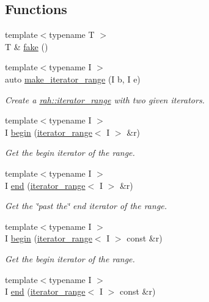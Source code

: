 \subsection*{Functions}
\begin{DoxyCompactItemize}
\item 
{\footnotesize template$<$typename T $>$ }\\T \& \mbox{\hyperlink{namespacerah_a11785bbdf970efa1bc57fc14993b77bf}{fake}} ()
\item 
{\footnotesize template$<$typename I $>$ }\\auto \mbox{\hyperlink{namespacerah_a4e145bfeb8a932058e20fc4cb4e7c206}{make\+\_\+iterator\+\_\+range}} (I b, I e)
\begin{DoxyCompactList}\small\item\em Create a \mbox{\hyperlink{structrah_1_1iterator__range}{rah\+::iterator\+\_\+range}} with two given iterators. \end{DoxyCompactList}\item 
{\footnotesize template$<$typename I $>$ }\\I \mbox{\hyperlink{namespacerah_a2c4a19e57cc4e0753e93830f247def6d}{begin}} (\mbox{\hyperlink{structrah_1_1iterator__range}{iterator\+\_\+range}}$<$ I $>$ \&r)
\begin{DoxyCompactList}\small\item\em Get the begin iterator of the range. \end{DoxyCompactList}\item 
{\footnotesize template$<$typename I $>$ }\\I \mbox{\hyperlink{namespacerah_aaddd1442cd76b96876e692cdefe7261d}{end}} (\mbox{\hyperlink{structrah_1_1iterator__range}{iterator\+\_\+range}}$<$ I $>$ \&r)
\begin{DoxyCompactList}\small\item\em Get the \char`\"{}past the\char`\"{} end iterator of the range. \end{DoxyCompactList}\item 
{\footnotesize template$<$typename I $>$ }\\I \mbox{\hyperlink{namespacerah_a14e69321e6772651b349cb31467ea3a2}{begin}} (\mbox{\hyperlink{structrah_1_1iterator__range}{iterator\+\_\+range}}$<$ I $>$ const \&r)
\begin{DoxyCompactList}\small\item\em Get the begin iterator of the range. \end{DoxyCompactList}\item 
{\footnotesize template$<$typename I $>$ }\\I \mbox{\hyperlink{namespacerah_a6b31fe80bf81abf3149df010cb265e20}{end}} (\mbox{\hyperlink{structrah_1_1iterator__range}{iterator\+\_\+range}}$<$ I $>$ const \&r)

\end{DoxyCompactItemize}
